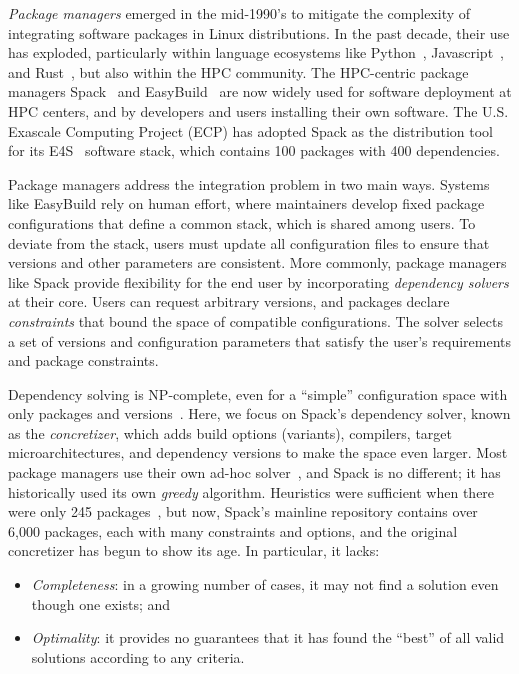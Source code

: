 {\it Package managers} emerged in the mid-1990's to mitigate the complexity of
integrating software packages in Linux distributions. In the past decade, their use has
exploded, particularly within language ecosystems like Python~\cite{pip},
Javascript~\cite{npm}, and Rust~\cite{cargo}, but also within the HPC community. The
HPC-centric package managers Spack~\cite{gamblin+:sc15} and
EasyBuild~\cite{hoste+:pyhpc12} are now widely used for software deployment at HPC
centers, and by developers and users installing their own software. The U.S. Exascale
Computing Project (ECP) has adopted Spack as the distribution tool for its
E4S~\cite{e4s} software stack, which contains 100 packages with 400 dependencies.

Package managers address the integration problem in two main ways. Systems like
EasyBuild rely on human effort, where maintainers develop fixed package configurations
that define a common stack, which is shared among users. To deviate from the stack,
users must update all configuration files to ensure that versions and other parameters
are consistent. More commonly, package managers like Spack provide flexibility for the
end user by incorporating {\it dependency solvers} at their core. Users can request
arbitrary versions, and packages declare {\it constraints} that bound the space of
compatible configurations. The solver selects a set of versions and configuration
parameters that satisfy the user's requirements and package constraints.

Dependency solving is NP-complete, even for a ``simple'' configuration space with only
packages and versions~\cite{dicosmo:edos,cox:version-sat}. Here, we focus on Spack's
dependency solver, known as the {\it concretizer}, which adds build options (variants),
compilers, target microarchitectures, and dependency versions to make the space even
larger. Most package managers use their own ad-hoc solver~\cite{abate2020dependency},
and Spack is no different; it has historically used its own {\it greedy} algorithm.
Heuristics were sufficient when there were only 245 packages~\cite{gamblin+:sc15}, but
now, Spack's mainline repository contains over 6,000 packages, each with many
constraints and options, and the original concretizer has begun to show its age. In
particular, it lacks:
\begin{itemize}
\item {\it Completeness}: in a growing number of cases, it may not find a solution even
  though one exists; and
\item {\it Optimality}: it provides no guarantees that it has found the ``best''
  of all valid solutions according to any criteria.
\end{itemize}

